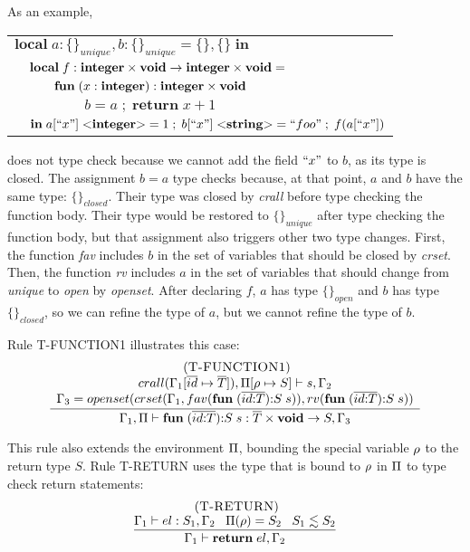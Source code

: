 As an example,
\begin{center}
\begin{tabular}{llll}
\multicolumn{4}{l}{$\mathbf{local} \; a:\{\}_{unique}, b:\{\}_{unique} = \{\}, \{\} \; \mathbf{in}$}\\
& \multicolumn{3}{l}{$\mathbf{local} \; f:\mathbf{integer} \times \mathbf{void} \rightarrow \mathbf{integer} \times \mathbf{void} =$}\\
& & \multicolumn{2}{l}{$\mathbf{fun} \; (x:\mathbf{integer}):\mathbf{integer} \times \mathbf{void}$}\\
& & & \multicolumn{1}{l}{$b = a \;;\; \mathbf{return} \; x + 1$}\\
& \multicolumn{3}{l}{$\mathbf{in} \; a[``x"] \; {<}\mathbf{integer}{>} = 1 \;;\; b[``x"] \; {<}\mathbf{string}{>} = ``foo" \;;\; f(a[``x"])$}
\end{tabular}
\end{center}
does not type check because we cannot add the field
$``x"$ to $b$, as its type is closed.
The assignment $b = a$ type checks because, at that point,
$a$ and $b$ have the same type: $\{\}_{closed}$.
Their type was closed by \emph{crall} before type checking
the function body.
Their type would be restored to $\{\}_{unique}$ after type checking
the function body, but that assignment also triggers other two type changes.
First, the function \emph{fav} includes $b$ in the set of variables
that should be closed by \emph{crset}.
Then, the function \emph{rv} includes $a$ in the set of variables
that should change from \emph{unique} to \emph{open} by \emph{openset}.
After declaring $f$, $a$ has type $\{\}_{open}$ and $b$ has type $\{\}_{closed}$,
so we can refine the type of $a$, but we cannot refine the type of $b$.

Rule \textsc{T-FUNCTION1} illustrates this case:
\[
\begin{array}{c}
\; (\textsc{T-FUNCTION1})\\
\dfrac{\begin{array}{c}
       crall(\Gamma_{1}[\overline{id} \mapsto \overline{T}]), \Pi[\rho \mapsto S] \vdash s, \Gamma_{2}\\
       \Gamma_{3} = openset(crset(\Gamma_{1}, fav(\mathbf{fun} \; (\overline{id{:}T}){:}S \; s)),rv(\mathbf{fun} \; (\overline{id{:}T}){:}S \; s))
       \end{array}}
      {\Gamma_{1}, \Pi \vdash \mathbf{fun} \; (\overline{id{:}T}){:}S \; s:\overline{T} \times \mathbf{void} \rightarrow S, \Gamma_{3}}
\end{array}
\]

This rule also extends the environment $\Pi$, bounding the special
variable $\rho$ to the return type $S$.
Rule \textsc{T-RETURN} uses the type that is bound to $\rho$ in
$\Pi$ to type check return statements:
\[
\begin{array}{c}
\; (\textsc{T-RETURN})\\
\dfrac{\Gamma_{1} \vdash el:S_{1}, \Gamma_{2} \;\;\;
       \Pi(\rho) = S_{2} \;\;\;
       S_{1} \lesssim S_{2}}
      {\Gamma_{1} \vdash \mathbf{return} \; el, \Gamma_{2}}
\end{array}
\]

